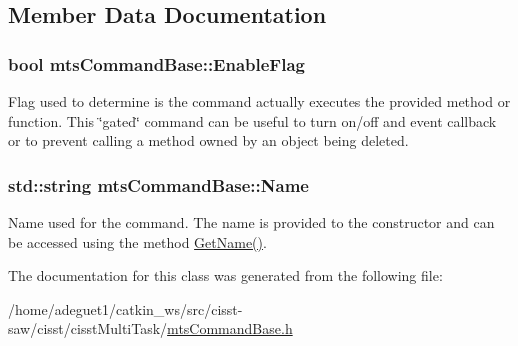 \subsection{Member Data Documentation}
\hypertarget{classmts_command_base_a2bfcac24f5e4fc80bf32071da17533d1}{
\subsubsection[{Enable\-Flag}]{\setlength{\rightskip}{0pt plus 5cm}bool mts\-Command\-Base\-::\-Enable\-Flag\hspace{0.3cm}{\ttfamily [protected]}}}\label{classmts_command_base_a2bfcac24f5e4fc80bf32071da17533d1}
Flag used to determine is the command actually executes the provided method or function. This \char`\"{}gated\char`\"{} command can be useful to turn on/off and event callback or to prevent calling a method owned by an object being deleted. \hypertarget{classmts_command_base_ad39ade733143ebd95ea8dd8732f899c6}{
\subsubsection[{Name}]{\setlength{\rightskip}{0pt plus 5cm}std\-::string mts\-Command\-Base\-::\-Name\hspace{0.3cm}{\ttfamily [protected]}}}\label{classmts_command_base_ad39ade733143ebd95ea8dd8732f899c6}
Name used for the command. The name is provided to the constructor and can be accessed using the method \hyperlink{classmts_command_base_ad5c99e2aa1e1a5a13956ace724cb1bc1}{Get\-Name()}. 

The documentation for this class was generated from the following file\-:\begin{DoxyCompactItemize}
\item 
/home/adeguet1/catkin\-\_\-ws/src/cisst-\/saw/cisst/cisst\-Multi\-Task/\hyperlink{mts_command_base_8h}{mts\-Command\-Base.\-h}\end{DoxyCompactItemize}
